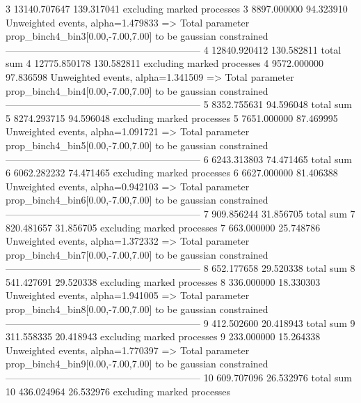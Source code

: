 3          13140.707647    139.317041      excluding marked processes    
3          8897.000000     94.323910       Unweighted events, alpha=1.479833
  => Total parameter prop_binch4_bin3[0.00,-7.00,7.00] to be gaussian constrained
------------------------------------------------------------
4          12840.920412    130.582811      total sum                     
4          12775.850178    130.582811      excluding marked processes    
4          9572.000000     97.836598       Unweighted events, alpha=1.341509
  => Total parameter prop_binch4_bin4[0.00,-7.00,7.00] to be gaussian constrained
------------------------------------------------------------
5          8352.755631     94.596048       total sum                     
5          8274.293715     94.596048       excluding marked processes    
5          7651.000000     87.469995       Unweighted events, alpha=1.091721
  => Total parameter prop_binch4_bin5[0.00,-7.00,7.00] to be gaussian constrained
------------------------------------------------------------
6          6243.313803     74.471465       total sum                     
6          6062.282232     74.471465       excluding marked processes    
6          6627.000000     81.406388       Unweighted events, alpha=0.942103
  => Total parameter prop_binch4_bin6[0.00,-7.00,7.00] to be gaussian constrained
------------------------------------------------------------
7          909.856244      31.856705       total sum                     
7          820.481657      31.856705       excluding marked processes    
7          663.000000      25.748786       Unweighted events, alpha=1.372332
  => Total parameter prop_binch4_bin7[0.00,-7.00,7.00] to be gaussian constrained
------------------------------------------------------------
8          652.177658      29.520338       total sum                     
8          541.427691      29.520338       excluding marked processes    
8          336.000000      18.330303       Unweighted events, alpha=1.941005
  => Total parameter prop_binch4_bin8[0.00,-7.00,7.00] to be gaussian constrained
------------------------------------------------------------
9          412.502600      20.418943       total sum                     
9          311.558335      20.418943       excluding marked processes    
9          233.000000      15.264338       Unweighted events, alpha=1.770397
  => Total parameter prop_binch4_bin9[0.00,-7.00,7.00] to be gaussian constrained
------------------------------------------------------------
10         609.707096      26.532976       total sum                     
10         436.024964      26.532976       excluding marked processes    
